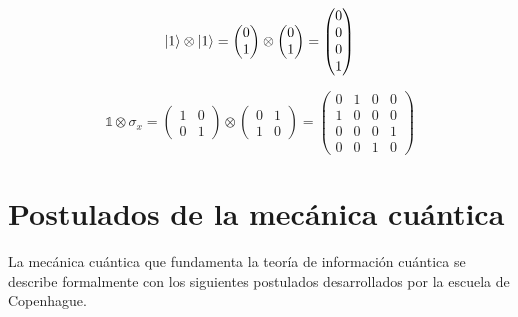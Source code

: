 \begin{equation*}
    \ket{1} \otimes \ket{1}
    = \begin{pmatrix} 0\\1 \end{pmatrix} \otimes \begin{pmatrix} 0\\1 \end{pmatrix}
    = \begin{pmatrix} 0\\0\\0\\1 \end{pmatrix}
\end{equation*}

\begin{equation*}
    \mathds{1} \otimes \sigma_x
    = \begin{pmatrix}
        1 & 0 \\
        0 & 1
        \end{pmatrix} \otimes
        \begin{pmatrix}
            0 & 1 \\
            1 & 0
        \end{pmatrix}
    = \begin{pmatrix}
        0 & 1 & 0 & 0 \\
        1 & 0 & 0 & 0 \\
        0 & 0 & 0 & 1 \\
        0 & 0 & 1 & 0
    \end{pmatrix}
\end{equation*}

\section{Postulados de la mecánica cuántica}

La mecánica cuántica que fundamenta la teoría de información cuántica se describe formalmente con los siguientes postulados desarrollados por la escuela de Copenhague.

